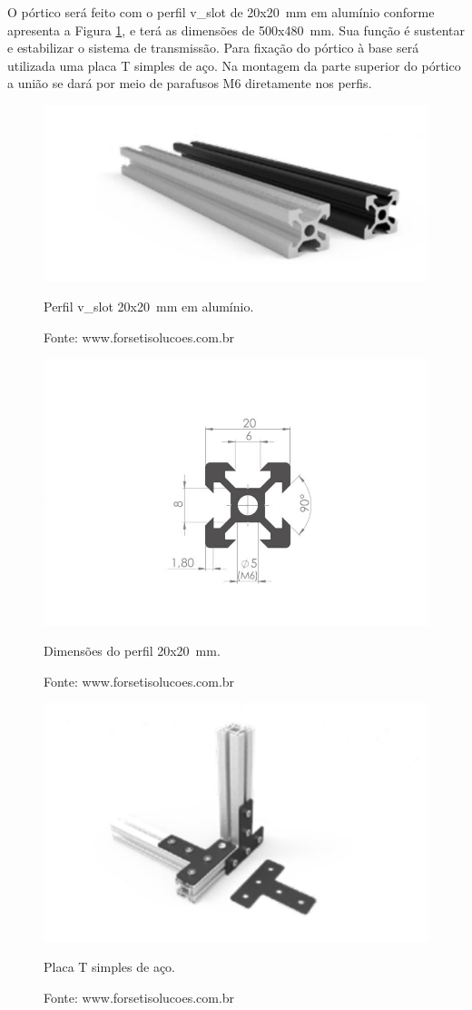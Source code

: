 O pórtico será feito com o perfil v\_slot de 20x20~mm em alumínio conforme apresenta 
a Figura \ref{fig:p20x20p}, e terá as dimensões de 500x480~mm. Sua função é sustentar 
e estabilizar o sistema de transmissão. Para fixação do pórtico à base será utilizada 
uma placa T simples de aço. Na montagem da parte superior do pórtico a união 
se dará por meio de parafusos M6 diretamente nos perfis.

\begin{figure}[H]
\centering
\includegraphics[width = 0.5\linewidth]{figuras/p20x20p}
\caption{Perfil v\_slot 20x20~mm em alumínio.}
\caption*{Fonte: www.forsetisolucoes.com.br}
\label{fig:p20x20p}
\end{figure}
    
\begin{figure}[H]
\centering
\includegraphics[width = 1\linewidth]{figuras/p20x20d}
\caption{Dimensões do perfil 20x20~mm.}
\caption*{Fonte: www.forsetisolucoes.com.br}
\label{fig:p20x20d}
\end{figure}
    
\begin{figure}[H]
\centering
\includegraphics[width = 0.5\linewidth]{figuras/placatp}
\caption{Placa T simples de aço.}
\caption*{Fonte: www.forsetisolucoes.com.br}
\label{fig:placatp}
\end{figure}
    
